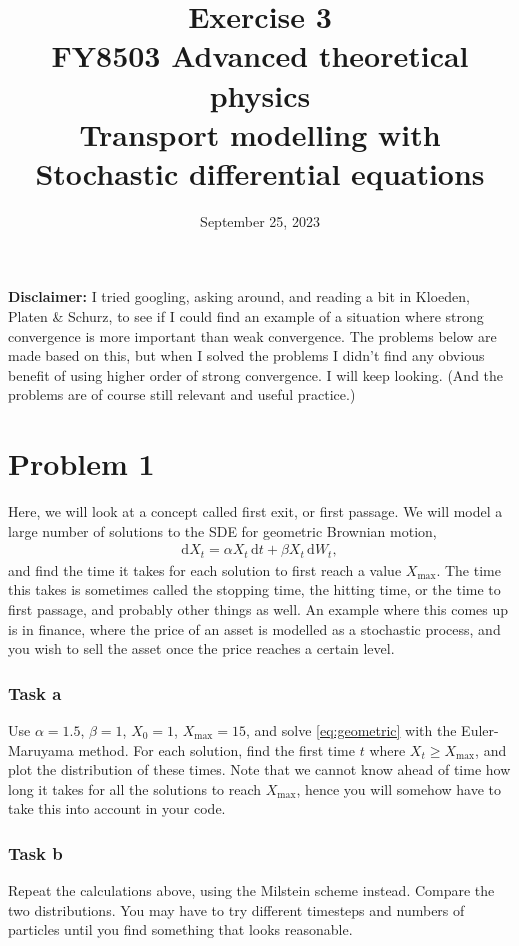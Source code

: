 \documentclass[a4paper]{article}
\title{\vspace{-3em} Exercise 3\\[10pt] \large FY8503 Advanced theoretical physics\\  Transport modelling with Stochastic differential equations}
\author{September 25, 2023}
\date{}
\begin{document}
\maketitle

{\bf Disclaimer:} I tried googling, asking around, and reading a bit in Kloeden, Platen \& Schurz, to see if I could find an example of a situation where strong convergence is more important than weak convergence. The problems below are made based on this, but when I solved the problems I didn't find any obvious benefit of using higher order of strong convergence. I will keep looking. (And the problems are of course still relevant and useful practice.)

\section*{Problem 1}

Here, we will look at a concept called first exit, or first passage. We will model a large number of solutions to the SDE for geometric Brownian motion,
\begin{align}
    \label{eq:geometric}
    \mathrm{d} X_t = \alpha X_t \, \mathrm{d}t + \beta X_t \, \mathrm{d}W_t,
\end{align}
and find the time it takes for each solution to first reach a value $X_\mathrm{max}$. The time this takes is sometimes called the stopping time, the hitting time, or the time to first passage, and probably other things as well. An example where this comes up is in finance, where the price of an asset is modelled as a stochastic process, and you wish to sell the asset once the price reaches a certain level.


\subsubsection*{Task a}
Use $\alpha=1.5$, $\beta=1$, $X_0=1$, $X_\mathrm{max}=15$, and solve \eqref{eq:geometric} with the Euler-Maruyama method. For each solution, find the first time $t$ where $X_t \geq X_\mathrm{max}$, and plot the distribution of these times. Note that we cannot know ahead of time how long it takes for all the solutions to reach $X_\mathrm{max}$, hence you will somehow have to take this into account in your code.

\subsubsection*{Task b}
Repeat the calculations above, using the Milstein scheme instead. Compare the two distributions. You may have to try different timesteps and numbers of particles until you find something that looks reasonable.
\end{document}
